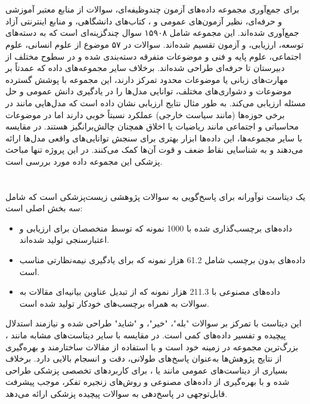 \documentclass[11pt, a4paper, oneside]{book}
\begin{document}
		\section{}
			برای جمع‌آوری مجموعه داده‌های آزمون چندوظیفه‌ای، سوالات از منابع معتبر آموزشی و حرفه‌ای، نظیر آزمون‌های عمومی  و ، کتاب‌های دانشگاهی، و منابع اینترنتی آزاد جمع‌آوری شده‌اند. این مجموعه شامل ۱۵۹۰۸ سوال چندگزینه‌ای است که به دسته‌های توسعه، ارزیابی، و آزمون تقسیم شده‌اند. سوالات در ۵۷ موضوع از علوم انسانی، علوم اجتماعی، علوم پایه و فنی و موضوعات متفرقه دسته‌بندی شده و در سطوح مختلف از دبیرستان تا حرفه‌ای طراحی شده‌اند. برخلاف سایر مجموعه‌های داده که عمدتاً بر مهارت‌های زبانی یا موضوعات محدود تمرکز دارند، این مجموعه با پوشش گسترده موضوعات و دشواری‌های مختلف، توانایی مدل‌ها را در یادگیری دانش عمومی و حل مسئله ارزیابی می‌کند. به طور مثال نتایج ارزیابی نشان داده است که مدل‌هایی مانند  در برخی حوزه‌ها (مانند سیاست خارجی) عملکرد نسبتاً خوبی دارند اما در موضوعات محاسباتی و اجتماعی مانند ریاضیات یا اخلاق همچنان چالش‌برانگیز هستند. در مقایسه با سایر مجموعه‌ها، این داده‌ها ابزار بهتری برای سنجش توانایی‌های واقعی مدل‌ها ارائه می‌دهند و به شناسایی نقاط ضعف و قوت آن‌ها کمک می‌کنند. در این پروژه تنها مباحث پزشکی این مجموعه داده مورد بررسی است. \cite{hendrycks_measuring_2021}
		
		\section{}
			 	یک دیتاست نوآورانه برای پاسخ‌گویی به سوالات پژوهشی زیست‌پزشکی است که شامل سه بخش اصلی است:
			 	
			 	\begin{itemize}
			 		
			 		\item داده‌های برچسب‌گذاری شده  با 1000 نمونه که توسط متخصصان برای ارزیابی و اعتبارسنجی تولید شده‌اند.
			 		
			 		\item داده‌های بدون برچسب  شامل 61.2 هزار نمونه که برای یادگیری نیمه‌نظارتی مناسب است.
			 		
			 		\item داده‌های مصنوعی  با 211.3 هزار نمونه که از تبدیل عناوین بیانیه‌ای مقالات به سوالات به همراه برچسب‌های خودکار تولید شده است.
			 		
			 	\end{itemize}
			این دیتاست با تمرکز بر سوالات "بله"، "خیر"، و "شاید" طراحی شده و نیازمند استدلال پیچیده و تفسیر داده‌های کمی است. در مقایسه با سایر دیتاست‌های مشابه مانند ،  بزرگ‌ترین مجموعه در زمینه خود است و با استفاده از مقالات ساختارمند  و بهره‌گیری از نتایج پژوهش‌ها به‌عنوان پاسخ‌های طولانی، دقت و انسجام بالایی دارد. برخلاف بسیاری از دیتاست‌های عمومی مانند  یا ،  برای کاربردهای تخصصی پزشکی طراحی شده و با بهره‌گیری از داده‌های مصنوعی و روش‌های زنجیره تفکر، موجب پیشرفت قابل‌توجهی در پاسخ‌دهی به سوالات پیچیده پزشکی ارائه می‌دهد. \cite{jin_pubmedqa_2019}
				
\end{document}
